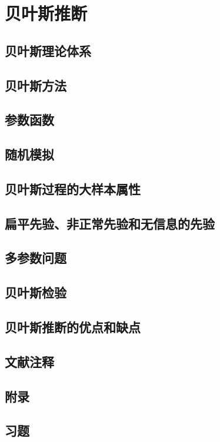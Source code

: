 \chapter{贝叶斯推断}

\section{贝叶斯理论体系}

\pending

\section{贝叶斯方法}

\pending

\section{参数函数}

\pending

\section{随机模拟}

\pending

\section{贝叶斯过程的大样本属性}

\pending

\section{扁平先验、非正常先验和无信息的先验}

\pending

\section{多参数问题}

\pending

\section{贝叶斯检验}

\pending

\section{贝叶斯推断的优点和缺点}

\pending

\section{文献注释}

\pending

\section{附录}

\pending

\section{习题}

\pending
